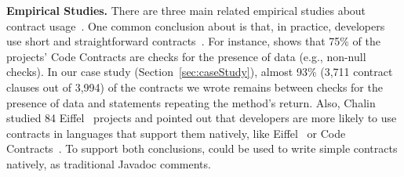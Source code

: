 \textbf{Empirical Studies.}
There are three main related empirical studies about contract usage~\cite{typeContracts,Estler-etal14,Chalin06}.
One common conclusion about is that, in practice, developers use short and straightforward contracts~\cite{typeContracts,Estler-etal14}. For instance, \cite{typeContracts} shows that 75\% of the projects' Code Contracts are checks for the presence of data (e.g., non-null checks).
In our case study (Section~\ref{sec:caseStudy}), almost 93\% (3,711 contract clauses out of 3,994) of the contracts we wrote remains between checks for the presence of data and statements repeating the method's return. 
Also, Chalin studied 84 Eiffel~\cite{eiffel} projects and pointed out that developers are more likely to use contracts in languages that support them natively, like Eiffel~\cite{eiffel} or Code Contracts~\cite{codeContractsPaper}. To support both conclusions, \contractjdoc{}could be used to write simple contracts natively, as traditional Javadoc comments.
